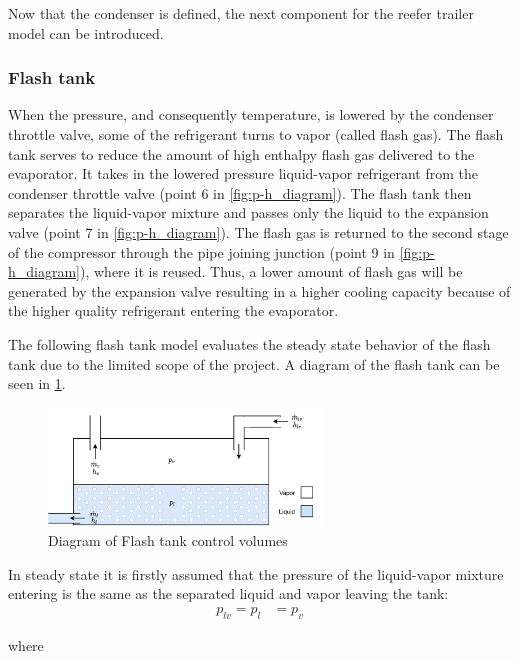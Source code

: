 Now that the condenser is defined, the next component for the reefer trailer model can be introduced.

\subsubsection{Flash tank}\label{sec:componentModel_flash-tank}
When the pressure, and consequently temperature, is lowered by the condenser throttle valve, some of the refrigerant turns to vapor (called flash gas). The flash tank serves to reduce the amount of high enthalpy flash gas delivered to the evaporator. It takes in the lowered pressure liquid-vapor refrigerant from the condenser throttle valve (point 6 in \cref{fig:p-h_diagram}). The flash tank then separates the liquid-vapor mixture and passes only the liquid to the expansion valve (point 7 in \cref{fig:p-h_diagram}). The flash gas is returned to the second stage of the compressor through the pipe joining junction (point 9 in \cref{fig:p-h_diagram}), where it is reused. Thus, a lower amount of flash gas will be generated by the expansion valve resulting in a higher cooling capacity because of the higher quality refrigerant entering the evaporator.

The following flash tank model evaluates the steady state behavior of the flash tank due to the limited scope of the project. A diagram of the flash tank can be seen in \cref{fig:flash_tank_CV}.

\begin{figure}[h]
	\centering
	\includegraphics[width=0.65\textwidth]{Graphics/Flash_tank.pdf}
	\caption{Diagram of Flash tank control volumes}
	\label{fig:flash_tank_CV}
\end{figure}

In steady state it is firstly assumed that the pressure of the liquid-vapor mixture entering is the same as the separated liquid and vapor leaving the tank:
\begin{align}
	p_{lv} 	= p_{l}					&  = p_{v}
	\label{eq:Flash_tank_pressure}
\end{align}

where

